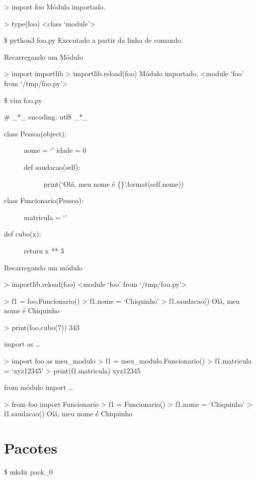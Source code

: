 \documentclass[letterpaper,10pt,brazil]{sphinxmanual}
\begin{document}
\textgreater{} import foo
Módulo importado.

\textgreater{} type(foo)
\textless{}class ‘module’\textgreater{}

\$ python3 foo.py
Executado a partir da linha de comando.

Recarregando um Módulo

\textgreater{} import importlib
\textgreater{} importlib.reload(foo)
Módulo importado.
\textless{}module ‘foo’ from ‘/tmp/foo.py’\textgreater{}

\$ vim foo.py

\# \_*\_ encoding: utf\sphinxhyphen{}8 \_*\_
\begin{description}
\item[{class Pessoa(object):}] \leavevmode
nome = ‘’
idade = 0
\begin{description}
\item[{def saudacao(self):}] \leavevmode
print(‘Olá, meu nome é \{\}’.format(self.nome))

\end{description}

\item[{class Funcionario(Pessoa):}] \leavevmode
matricula = ‘’

\item[{def cubo(x):}] \leavevmode
return x ** 3

\end{description}

Recarregando um módulo

\textgreater{} importlib.reload(foo)
\textless{}module ‘foo’ from ‘/tmp/foo.py’\textgreater{}

\textgreater{} f1 = foo.Funcionario()
\textgreater{} f1.nome = ‘Chiquinho’
\textgreater{} f1.saudacao()
Olá, meu nome é Chiquinho

\textgreater{} print(foo.cubo(7))
343

import as …

\textgreater{} import foo as meu\_modulo
\textgreater{} f1 = meu\_modulo.Funcionario()
\textgreater{} f1.matricula = ‘xyz12345’
\textgreater{} print(f1.matricula)
xyz12345

from módulo import …

\textgreater{} from foo import Funcionario
\textgreater{} f1 = Funcionario()
\textgreater{} f1.nome = ‘Chiquinho’
\textgreater{} f1.saudacao()
Olá, meu nome é Chiquinho


\chapter{Pacotes}
\label{\detokenize{content/packages:pacotes}}\label{\detokenize{content/packages::doc}}
\$ mkdir pack\_0
\end{document}
